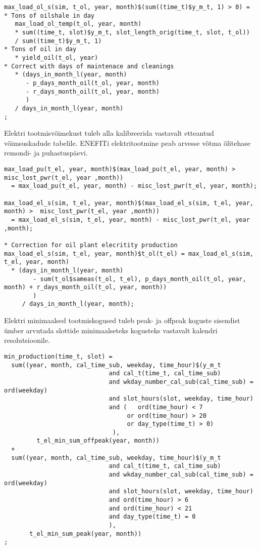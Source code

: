 \begin{verbatim}
max_load_ol_s(sim, t_ol, year, month)$(sum((time_t)$y_m_t, 1) > 0) =
* Tons of oilshale in day
   max_load_ol_temp(t_ol, year, month)
   * sum((time_t, slot)$y_m_t, slot_length_orig(time_t, slot, t_ol))
   / sum((time_t)$y_m_t, 1)
* Tons of oil in day
   * yield_oil(t_ol, year)
* Correct with days of maintenace and cleanings
   * (days_in_month_l(year, month)
      - p_days_month_oil(t_ol, year, month)
      - r_days_month_oil(t_ol, year, month)
      )
   / days_in_month_l(year, month)
;
\end{verbatim}

Elektri tootmisvõimekust tuleb alla kalibreerida vastavalt etteantud võimsus\-kadude tabelile. ENEFITi elektritootmine peab arvesse võtma õlitehase remondi- ja pu\-hastus\-päevi.
\begin{verbatim}
max_load_pu(t_el, year, month)$(max_load_pu(t_el, year, month) >  misc_lost_pwr(t_el, year ,month))
  = max_load_pu(t_el, year, month) - misc_lost_pwr(t_el, year, month);

max_load_el_s(sim, t_el, year, month)$(max_load_el_s(sim, t_el, year, month) >  misc_lost_pwr(t_el, year ,month))
  = max_load_el_s(sim, t_el, year, month) - misc_lost_pwr(t_el, year ,month);

* Correction for oil plant elecritity production
max_load_el_s(sim, t_el, year, month)$t_ol(t_el) = max_load_el_s(sim, t_el, year, month)
  * (days_in_month_l(year, month)
        - sum(t_ol$sameas(t_ol, t_el), p_days_month_oil(t_ol, year, month) + r_days_month_oil(t_ol, year, month))
        )
     / days_in_month_l(year, month);
\end{verbatim}

Elektri minimaalsed tootmiskogused tuleb peak- ja offpeak koguste sisendist ümber arvutada slottide minimaalseteks kogusteks vastavalt kalendri resolutsioonile.

\begin{verbatim}
min_production(time_t, slot) =
  sum((year, month, cal_time_sub, weekday, time_hour)$(y_m_t
                             and cal_t(time_t, cal_time_sub)
                             and wkday_number_cal_sub(cal_time_sub) = ord(weekday)
                             and slot_hours(slot, weekday, time_hour)
                             and (   ord(time_hour) < 7
                                  or ord(time_hour) > 20
                                  or day_type(time_t) > 0)
                              ),
         t_el_min_sum_offpeak(year, month))
  +
  sum((year, month, cal_time_sub, weekday, time_hour)$(y_m_t
                             and cal_t(time_t, cal_time_sub)
                             and wkday_number_cal_sub(cal_time_sub) = ord(weekday)
                             and slot_hours(slot, weekday, time_hour)
                             and ord(time_hour) > 6
                             and ord(time_hour) < 21
                             and day_type(time_t) = 0
                             ),
       t_el_min_sum_peak(year, month))
;
\end{verbatim}